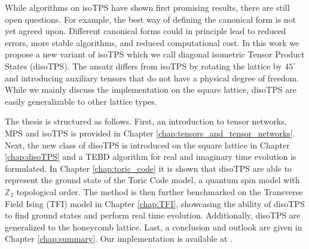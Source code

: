 While algorithms on isoTPS have shown first promising results, there are still open questions. For example, the best way of defining the canonical form is not yet agreed upon. Different canonical forms could in principle lead to reduced errors, more stable algorithms, and reduced computational cost. In this work we propose a new variant of isoTPS which we call diagonal isometric Tensor Product States (disoTPS). The ansatz differs from isoTPS by rotating the lattice by $45^\circ$ and introducing auxiliary tensors that do not have a physical degree of freedom. While we mainly discuss the implementation on the square lattice, disoTPS are easily generalizable to other lattice types.
\par
The thesis is structured as follows. First, an introduction to tensor networks, MPS and isoTPS is provided in Chapter \ref{chap:tensors_and_tensor_networks}. Next, the new class of disoTPS is introduced on the square lattice in Chapter \ref{chap:disoTPS} and a TEBD algorithm for real and imaginary time evolution is formulated. In Chapter \ref{chap:toric_code} it is shown that disoTPS are able to represent the ground state of the Toric Code model, a quantum spin model with $\mathbb{Z}_2$ topological order. The method is then further benchmarked on the Transverse Field Ising (TFI) model in Chapter \ref{chap:TFI}, showcasing the ability of disoTPS to find ground states and perform real time evolution. Additionally, disoTPS are generalized to the honeycomb lattice. Last, a conclusion and outlook are given in Chapter \ref{chap:summary}. Our implementation is available at \cite{cite:github_disoTPS}.